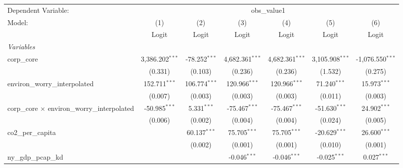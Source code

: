 
\begingroup
\centering
\begin{tabular}{lcccccc}
   \toprule
   Dependent Variable: & \multicolumn{6}{c}{obs\_value1}\\
   Model:                                               & (1)               & (2)             & (3)               & (4)               & (5)               & (6)\\  
                                                        &  Logit            & Logit           & Logit             & Logit             & Logit             & Logit\\  
   \midrule
   \emph{Variables}\\
   corp\_core                                           & 3,386.202$^{***}$ & -78.252$^{***}$ & 4,682.361$^{***}$ & 4,682.361$^{***}$ & 3,105.908$^{***}$ & -1,076.550$^{***}$\\   
                                                        & (0.331)           & (0.103)         & (0.236)           & (0.236)           & (1.532)           & (0.275)\\   
   environ\_worry\_interpolated                         & 152.711$^{***}$   & 106.774$^{***}$ & 120.966$^{***}$   & 120.966$^{***}$   & 71.240$^{***}$    & 15.973$^{***}$\\   
                                                        & (0.007)           & (0.003)         & (0.003)           & (0.003)           & (0.011)           & (0.003)\\   
   corp\_core $\times$ environ\_worry\_interpolated     & -50.985$^{***}$   & 5.331$^{***}$   & -75.467$^{***}$   & -75.467$^{***}$   & -51.630$^{***}$   & 24.902$^{***}$\\   
                                                        & (0.006)           & (0.002)         & (0.004)           & (0.004)           & (0.024)           & (0.005)\\   
   co2\_per\_capita                                     &                   & 60.137$^{***}$  & 75.705$^{***}$    & 75.705$^{***}$    & -20.629$^{***}$   & 26.600$^{***}$\\   
                                                        &                   & (0.002)         & (0.001)           & (0.001)           & (0.010)           & (0.001)\\   
   ny\_gdp\_pcap\_kd                                    &                   &                 & -0.046$^{***}$    & -0.046$^{***}$    & -0.025$^{***}$    & 0.027$^{***}$\\   

\end{tabular}
